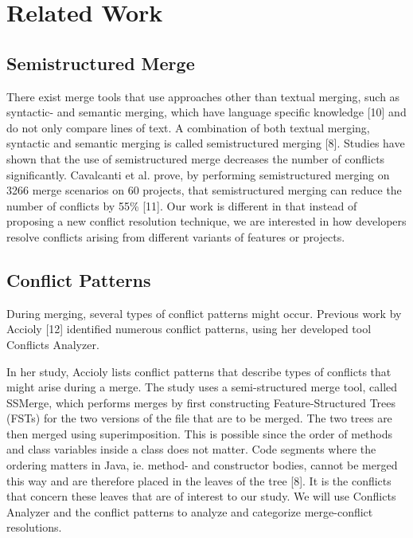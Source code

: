\section{Related Work}

\subsection{Semistructured Merge}
There exist merge tools that use approaches other than textual merging, such as syntactic- and semantic merging, which have language specific knowledge [10] and do not only compare lines of text. A combination of both textual merging, syntactic and semantic merging is called semistructured merging [8]. Studies have shown that the use of semistructured merge decreases the number of conflicts significantly. Cavalcanti et al. prove, by performing semistructured merging on 3266 merge scenarios on 60 projects, that semistructured merging can reduce the number of conflicts by 55\% [11]. Our work is different in that instead of proposing a new conflict resolution technique, we are interested in how developers resolve conflicts arising from different variants of features or projects.

\subsection{Conflict Patterns}\label{sec:cp}
During merging, several types of conflict patterns might occur. Previous work by Accioly [12] identified numerous conflict patterns, using her developed tool Conflicts Analyzer.

In her study, Accioly lists conflict patterns that describe types of conflicts that might arise during a merge. The study uses a semi-structured merge tool, called SSMerge, which performs merges by first constructing Feature-Structured Trees (FSTs) for the two versions of the file that are to be merged. The two trees are then merged using superimposition. This is possible since the order of methods and class variables inside a class does not matter. Code segments where the ordering matters in Java, ie. method- and constructor bodies, cannot be merged this way and are therefore placed in the leaves of the tree [8]. It is the conflicts that concern these leaves that are of interest to our study. We will use Conflicts Analyzer and the conflict patterns to analyze and categorize merge-conflict resolutions.


